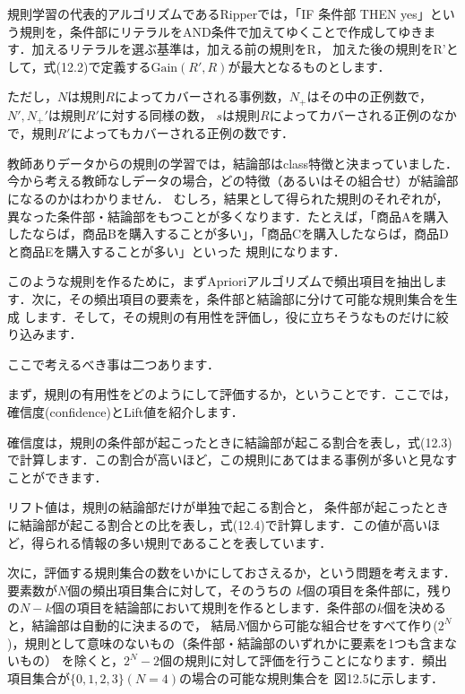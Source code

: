規則学習の代表的アルゴリズムであるRipperでは，「IF 条件部 THEN yes」という規則を，条件部にリテラルをAND条件で加えてゆくことで作成してゆきます．加えるリテラルを選ぶ基準は，加える前の規則をR，
加えた後の規則をR'として，式(12.2)で定義する$\mbox{Gain}(R', R)$が最大となるものとします．


ただし，$N$は規則$R$によってカバーされる事例数，$N_+$はその中の正例数で，$N', N_+'$は規則$R'$に対する同様の数，
$s$は規則$R$によってカバーされる正例のなかで，規則$R'$によってもカバーされる正例の数です．


教師ありデータからの規則の学習では，結論部はclass特徴と決まっていました．
今から考える教師なしデータの場合，どの特徴（あるいはその組合せ）が結論部になるのかはわかりません．
むしろ，結果として得られた規則のそれぞれが，異なった条件部・結論部をもつことが多くなります．たとえば，「商品Aを購入
したならば，商品Bを購入することが多い」，「商品Cを購入したならば，商品Dと商品Eを購入することが多い」といった
規則になります．


このような規則を作るために，まずAprioriアルゴリズムで頻出項目を抽出します．次に，その頻出項目の要素を，条件部と結論部に分けて可能な規則集合を生成
します．そして，その規則の有用性を評価し，役に立ちそうなものだけに絞り込みます．


ここで考えるべき事は二つあります．


まず，規則の有用性をどのようにして評価するか，ということです．ここでは，確信度(confidence)とLift値を紹介します．

確信度は，規則の条件部が起こったときに結論部が起こる割合を表し，式(12.3)で計算します．この割合が高いほど，この規則にあてはまる事例が多いと見なすことができます．


リフト値は，規則の結論部だけが単独で起こる割合と，
条件部が起こったときに結論部が起こる割合との比を表し，式(12.4)で計算します．この値が高いほど，得られる情報の多い規則であることを表しています．



次に，評価する規則集合の数をいかにしておさえるか，という問題を考えます．要素数が$N$個の頻出項目集合に対して，そのうちの
$k$個の項目を条件部に，残りの$N-k$個の項目を結論部において規則を作るとします．条件部の$k$個を決めると，結論部は自動的に決まるので，
結局$N$個から可能な組合せをすべて作り($2^N$)，規則として意味のないもの（条件部・結論部のいずれかに要素を1つも含まないもの）
を除くと，$2^N-2$個の規則に対して評価を行うことになります．頻出項目集合が$\{0,1,2,3\} (N=4)$の場合の可能な規則集合を
図12.5に示します．

